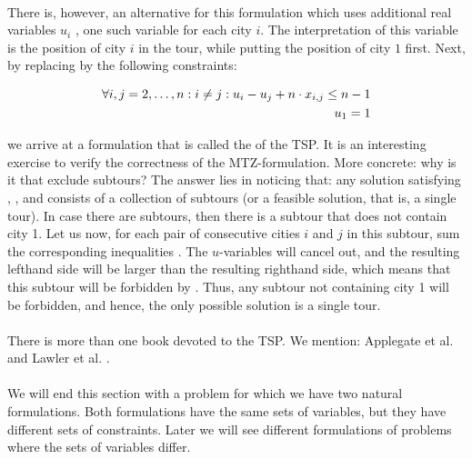 \paragraph{}
There is, however, an alternative for this formulation which uses additional real variables $u_i$ , one such variable for each city $i$. The interpretation of this variable is the position of city $i$ in the tour, while putting the position of city $1$ first. Next, by replacing  by the following constraints:

\begin{eqnarray}
\forall \rangei[i,j]{2}{n}:i\neq j:u_i-u_j+n\cdot x_{i,j}\leq n-1\eqnlab{mtz-c1}\\
u_1=1\eqnlab{mtz-c2}
\end{eqnarray}

we arrive at a formulation that is called the  of the TSP. It is an interesting exercise to verify the correctness of the MTZ-formulation. More concrete: why is it that  exclude subtours? The answer lies in noticing that: any solution satisfying , , and  consists of a collection of subtours (or a feasible solution, that is, a single tour). In case there are subtours, then there is a subtour that does not contain city 1. Let us now, for each pair of consecutive cities $i$ and $j$ in this subtour, sum the corresponding inequalities . The $u$-variables will cancel out, and the resulting lefthand side will be larger than the resulting righthand side, which means that this subtour will be forbidden by . Thus, any subtour not containing city 1 will be forbidden, and hence, the only possible solution is a single tour.

\paragraph{}
There is more than one book devoted to the TSP. We mention: Applegate et al. \cite{Applegate.2006} and Lawler et al. \cite{Lawler85}.

\paragraph{}
We will end this section with a problem for which we have two natural formulations. Both formulations have the same sets of variables, but they have different sets of constraints. Later we will see different formulations of problems where the sets of variables differ.

